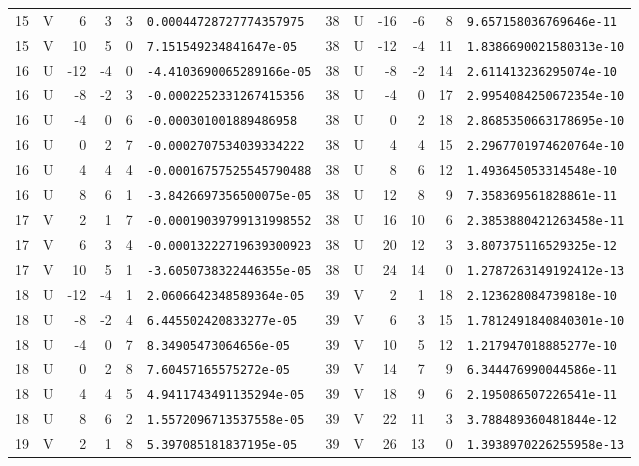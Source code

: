 \begin{longtable}{rcrrrl|rcrrrl}
15 & V & 6 & 3 & 3 & \texttt{0.00044728727774357975} & 38 & U & -16 & -6 & 8 & \texttt{9.657158036769646e-11}\\
15 & V & 10 & 5 & 0 & \texttt{7.151549234841647e-05} & 38 & U & -12 & -4 & 11 & \texttt{1.8386690021580313e-10}\\
16 & U & -12 & -4 & 0 & \texttt{-4.4103690065289166e-05} & 38 & U & -8 & -2 & 14 & \texttt{2.611413236295074e-10}\\
16 & U & -8 & -2 & 3 & \texttt{-0.0002252331267415356} & 38 & U & -4 & 0 & 17 & \texttt{2.9954084250672354e-10}\\
16 & U & -4 & 0 & 6 & \texttt{-0.000301001889486958} & 38 & U & 0 & 2 & 18 & \texttt{2.8685350663178695e-10}\\
16 & U & 0 & 2 & 7 & \texttt{-0.0002707534039334222} & 38 & U & 4 & 4 & 15 & \texttt{2.2967701974620764e-10}\\
16 & U & 4 & 4 & 4 & \texttt{-0.00016757525545790488} & 38 & U & 8 & 6 & 12 & \texttt{1.493645053314548e-10}\\
16 & U & 8 & 6 & 1 & \texttt{-3.8426697356500075e-05} & 38 & U & 12 & 8 & 9 & \texttt{7.358369561828861e-11}\\
17 & V & 2 & 1 & 7 & \texttt{-0.00019039799131998552} & 38 & U & 16 & 10 & 6 & \texttt{2.3853880421263458e-11}\\
17 & V & 6 & 3 & 4 & \texttt{-0.00013222719639300923} & 38 & U & 20 & 12 & 3 & \texttt{3.807375116529325e-12}\\
17 & V & 10 & 5 & 1 & \texttt{-3.6050738322446355e-05} & 38 & U & 24 & 14 & 0 & \texttt{1.2787263149192412e-13}\\
18 & U & -12 & -4 & 1 & \texttt{2.0606642348589364e-05} & 39 & V & 2 & 1 & 18 & \texttt{2.123628084739818e-10}\\
18 & U & -8 & -2 & 4 & \texttt{6.445502420833277e-05} & 39 & V & 6 & 3 & 15 & \texttt{1.7812491840840301e-10}\\
18 & U & -4 & 0 & 7 & \texttt{8.34905473064656e-05} & 39 & V & 10 & 5 & 12 & \texttt{1.217947018885277e-10}\\
18 & U & 0 & 2 & 8 & \texttt{7.60457165575272e-05} & 39 & V & 14 & 7 & 9 & \texttt{6.344476990044586e-11}\\
18 & U & 4 & 4 & 5 & \texttt{4.9411743491135294e-05} & 39 & V & 18 & 9 & 6 & \texttt{2.195086507226541e-11}\\
18 & U & 8 & 6 & 2 & \texttt{1.5572096713537558e-05} & 39 & V & 22 & 11 & 3 & \texttt{3.788489360481844e-12}\\
19 & V & 2 & 1 & 8 & \texttt{5.397085181837195e-05} & 39 & V & 26 & 13 & 0 & \texttt{1.3938970226255958e-13}\\

\end{longtable}
